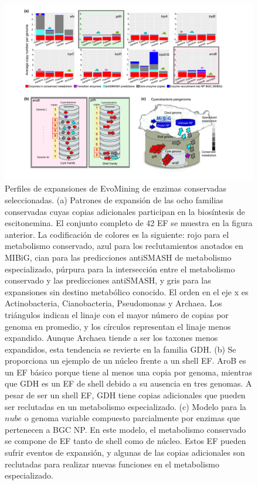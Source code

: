 \documentclass[12pt,twoside]{reedthesis}
\begin{document}
  \begin{figure}[h!tbp]
  \centering
  \includegraphics[angle = 0,scale = .6]{chapter2/FigurasPaper/Figure3.pdf}
  \caption[Patrones de expansión de familias que participan en la síntesis de escitonemina]{\footnotesize{Perfiles de expansiones de EvoMining de enzimas conservadas seleccionadas. (a) Patrones de expansión de las ocho familias conservadas cuyas copias adicionales participan en la biosíntesis de escitonemina. El conjunto completo de 42 EF se muestra en la figura anterior. La codificación de colores es la siguiente: rojo para el metabolismo conservado, azul para los reclutamientos anotados en MIBiG, cian para las predicciones antiSMASH de metabolismo especializado, púrpura para la intersección entre el metabolismo conservado y las predicciones antiSMASH, y gris para las expansiones sin destino metabólico conocido. El orden en el eje x es Actinobacteria, Cianobacteria, Pseudomonas y Archaea. Los triángulos indican el linaje con el mayor número de copias por genoma en promedio, y los círculos representan el linaje menos expandido. Aunque Archaea tiende a ser los taxones menos expandidos, esta tendencia se revierte en la familia GDH. (b) Se proporciona un ejemplo de un núcleo frente a un shell EF. AroB es un EF básico porque tiene al menos una copia por genoma, mientras que GDH es un EF de shell debido a su ausencia en tres genomas. A pesar de ser un shell EF, GDH tiene copias adicionales que pueden ser reclutadas en un metabolismo especializado. (c) Modelo para la $nube$ o genoma variable compuesto parcialmente por enzimas que pertenecen a BGC NP. En este modelo, el metabolismo conservado se compone de EF tanto de shell como de núcleo. Estos EF pueden sufrir eventos de expansión, y algunas de las copias adicionales son reclutadas para realizar nuevas funciones en el metabolismo especializado.}}
  \label{fig:ExpansionPatterns}
  \end{figure}
  
\end{document}
